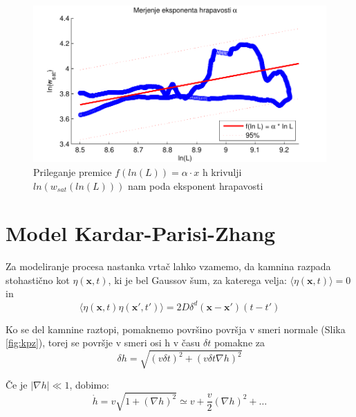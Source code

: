 \documentclass[a4paper, twoside, 12pt]{book}
\begin{document}
            \begin{figure}[h]
              \begin{center}
                \includegraphics{slike/menisija-alfa.pdf}
              \end{center}
              \caption{Prileganje premice $f(ln(L)) = \alpha \cdot x$ h krivulji $ln(w_{sat}(ln(L)))$ nam poda eksponent hrapavosti}
              \label{fig:menisija-alfa}
            \end{figure}


            \section{Model Kardar-Parisi-Zhang}

            Za modeliranje procesa nastanka vrtač lahko vzamemo, da kamnina razpada stohastično kot $\eta(\mathbf{x},t)$, ki je bel Gaussov šum, za katerega velja: $ \langle \eta(\mathbf{x},t) \rangle=0 $ in
        \begin{equation}
            \langle \eta(\mathbf{x},t) \eta(\mathbf{x'},t')\rangle = 2 D \delta^d(\mathbf{x}-\mathbf{x'})(t-t')
        \end{equation}

            Ko se del kamnine raztopi, pomaknemo površino površja v smeri normale (Slika \ref{fig:kpz}), torej se površje v smeri osi h v času $\delta t$ pomakne za 
        \begin{equation}
          \delta h = \sqrt{ (v \delta t)^2 + (v \delta t \nabla h)^2}
        \end{equation}

        Če je $|\nabla h| \ll 1$, dobimo: 
        \begin{equation}
            \dot h = v \sqrt{1 + (\nabla h)^2} \simeq v + \frac{v}{2} (\nabla h)^2 + \ldots
        \end{equation}
\end{document}
